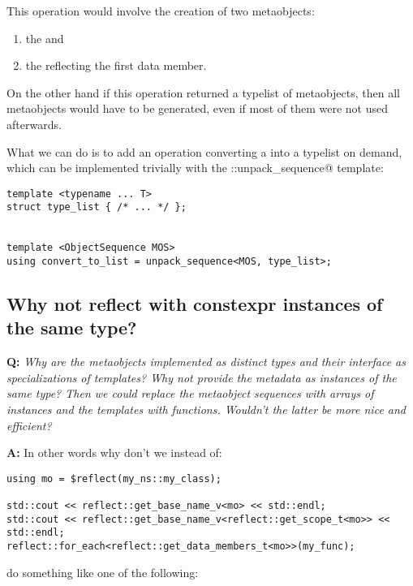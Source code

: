 This operation would involve the creation of two metaobjects:
\begin{enumerate}
	\item the  and
	\item the  reflecting the first data member.
\end{enumerate}

On the other hand if this operation returned a typelist of metaobjects,
then all metaobjects would have to be generated, even if most of them
were not used afterwards.

What we can do is to add an operation converting a 
into a typelist on demand, which can be implemented trivially with the
\verb@reflect::unpack_sequence@ template:

\begin{verbatim}
template <typename ... T>
struct type_list { /* ... */ };


template <ObjectSequence MOS>
using convert_to_list = unpack_sequence<MOS, type_list>;
\end{verbatim}

\subsection{Why not reflect with constexpr instances of the same type?}

\textbf{Q:} {\em Why are the metaobjects implemented as distinct types and
their interface as specializations of templates? Why not provide the metadata
as \verb@constexpr@ instances of the same type? Then we could replace the metaobject
sequences with arrays of \verb@constexpr@ instances and the templates with
\verb@constexpr@ functions. Wouldn't the latter be more nice and efficient?}

\textbf{A:}
In other words why don't we instead of:

\begin{verbatim}
using mo = $reflect(my_ns::my_class);

std::cout << reflect::get_base_name_v<mo> << std::endl;
std::cout << reflect::get_base_name_v<reflect::get_scope_t<mo>> << std::endl;
reflect::for_each<reflect::get_data_members_t<mo>>(my_func);
\end{verbatim}

do something like one of the following:

